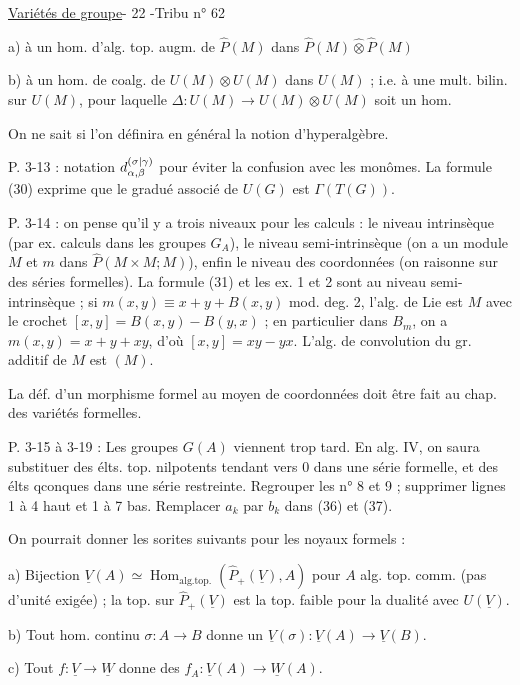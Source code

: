 \uline{Variétés de groupe}\hfill - 22 -\hfill Tribu n° 62

a) à un hom. d'alg. top. augm. de $\hat P(M)$ dans $\hat P(M)\mathbin{\widehat\otimes}\hat P(M)$

b) à un hom. de coalg. de $U(M)\otimes U(M)$ dans $U(M)$ ; i.e. à une mult. bilin. sur $U(M)$, pour laquelle $\Delta:U(M)\longrightarrow U(M)\otimes U(M)$ soit un hom.

On ne sait si l'on définira en général la notion d'hyperalgèbre.

P. 3-13 : notation $d^{({\sigma|\gamma})}_{\alpha,\beta}$ pour éviter la confusion avec les monômes. La formule (30) exprime que le gradué associé de $U(G)$ est $\Gamma(T(G))$.

P. 3-14 : on pense qu'il y a trois niveaux pour les calculs : le niveau intrinsèque (par ex. calculs dans les groupes $G_A$), le niveau semi-intrinsèque (on a un module $M$ et $m$ dans $\hat P(M\times M;M)$), enfin le niveau des coordonnées (on raisonne sur des séries formelles). La formule (31) et les ex. 1 et 2 sont au niveau semi-intrinsèque ; si $m(x,y)\equiv x+y+B(x,y)$ mod. deg. 2, l'alg. de Lie est $M$ avec le crochet $[x,y]=B(x,y)-B(y,x)$ ; en particulier dans $B_m$, on a $m(x,y)=x+y+xy$, d'où $[x,y]=xy-yx$. L'alg. de convolution du gr. additif de $M$ est $(M)$.

La déf. d'un morphisme formel au moyen de coordonnées doit être fait au chap. des variétés formelles.

P. 3-15 à 3-19 : Les groupes $G(A)$ viennent trop tard. En alg. IV, on saura substituer des élts. top. nilpotents tendant vers 0 dans une série formelle, et des élts qconques dans une série restreinte. Regrouper les n° 8 et 9 ; supprimer lignes 1 à 4 haut et 1 à 7 bas. Remplacer $a_k$ par $b_k$ dans (36) et (37).

On pourrait donner les sorites suivants pour les noyaux formels :

a) Bijection $\underline V(A)\simeq\operatorname{Hom}_{\mathrm{alg.top.}}(\hat P_+(\underline V),A)$ pour $A$ alg. top. comm. (pas d'unité exigée) ; la top. sur $\hat P_+(\underline V)$ est la top. faible pour la dualité avec $U(\underline V)$.

b) Tout hom. continu $\sigma:A\longrightarrow B$ donne un $\underline V(\sigma):\underline V(A)\longrightarrow\underline V(B)$.

c) Tout $f:\underline V\longrightarrow\underline W$ donne des $f_A:\underline V(A)\longrightarrow\underline W(A)$.

